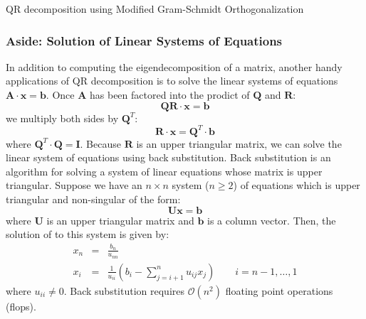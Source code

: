 \documentclass{article}[12pt]
\begin{document}
\begin{algorithm}[H]
   \begin{algorithmic}[1]
   \caption{QR decomposition using Modified Gram-Schmidt Orthogonalization}\label{alg:modgschmidt}
   \end{algorithmic}
\end{algorithm}

\subsubsection*{Aside: Solution of Linear Systems of Equations}
In addition to computing the eigendecomposition of a matrix, another handy applications of QR decomposition is to solve the linear systems of equations $\mathbf{A}\cdot\mathbf{x} = \mathbf{b}$.
Once $\mathbf{A}$ has been factored into the prodict of $\mathbf{Q}$ and $\mathbf{R}$:
\begin{equation}
\mathbf{Q}\mathbf{R}\cdot\mathbf{x} = \mathbf{b}
\end{equation}
we multiply both sides by $\mathbf{Q}^{T}$:
\begin{equation}
\mathbf{R}\cdot\mathbf{x} = \mathbf{Q}^{T}\cdot\mathbf{b}
\end{equation}
where $\mathbf{Q}^{T}\cdot\mathbf{Q} = \mathbf{I}$. Because $\mathbf{R}$ is an upper triangular matrix, 
we can solve the linear system of equations using back substitution. Back substitution is an algorithm for solving a system of linear equations whose matrix is upper triangular.
Suppose we have an $n\times{n}$ system ($n\geq{2}$) of equations which is upper triangular and non-singular of the form:
\begin{equation*}
\mathbf{U}\mathbf{x} = \mathbf{b}
\end{equation*}
where $\mathbf{U}$ is an upper triangular matrix and $\mathbf{b}$ is a column vector.
Then, the solution of to this system is given by:
\begin{eqnarray*}
x_{n} & = & \frac{b_{n}}{u_{nn}} \\
x_{i} & = & \frac{1}{u_{ii}}\left(b_{i} - \sum_{j=i+1}^{n}u_{ij}x_{j}\right)\qquad{i=n-1,\dots,1}
\end{eqnarray*}
where $u_{ii}\neq{0}$. Back substitution requires $\mathcal{O}(n^{2})$ floating point operations (flops).
\end{document}
